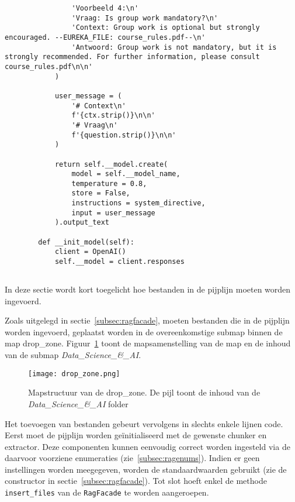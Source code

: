 \begin{verbatim}
                'Voorbeeld 4:\n'
                'Vraag: Is group work mandatory?\n'
                'Context: Group work is optional but strongly encouraged. --EUREKA_FILE: course_rules.pdf--\n'
                'Antwoord: Group work is not mandatory, but it is strongly recommended. For further information, please consult course_rules.pdf\n\n'
            )
            
            user_message = (
                '# Context\n'
                f'{ctx.strip()}\n\n'
                '# Vraag\n'
                f'{question.strip()}\n\n'
            )
            
            return self.__model.create(
                model = self.__model_name,
                temperature = 0.8,
                store = False,
                instructions = system_directive,
                input = user_message
            ).output_text
    
        def __init_model(self):
            client = OpenAI()
            self.__model = client.responses
\end{verbatim}

\subsection{}%
\label{subsec:usage}

\subsubsection{}%
\label{subsubsec:insertion}

In deze sectie wordt kort toegelicht hoe bestanden in de pijplijn moeten worden ingevoerd.

Zoals uitgelegd in sectie~\ref{subsec:ragfacade}, moeten bestanden die in de pijplijn worden ingevoerd, geplaatst worden in de overeenkomstige submap binnen de map drop\_zone. Figuur~\ref{fig:drop-zone} toont de mapsamenstelling van de map en de inhoud van de submap \emph{Data\_Science\_\&\_AI}.

\begin{figure}
    \centering
    \texttt{[image: drop\_zone.png]}
    \caption[Mapsamenstelling drop\_zone]{\label{fig:drop-zone}Mapstructuur van de drop\_zone. De pijl toont de inhoud van de \emph{Data\_Science\_\&\_AI} folder}
\end{figure}

Het toevoegen van bestanden gebeurt vervolgens in slechts enkele lijnen code. Eerst moet de pijplijn worden geïnitialiseerd met de gewenste chunker en extractor. Deze componenten kunnen eenvoudig correct worden ingesteld via de daarvoor voorziene enumeraties (zie~\ref{subsec:ragenums}). Indien er geen instellingen worden meegegeven, worden de standaardwaarden gebruikt (zie de constructor in sectie~\ref{subsec:ragfacade}). Tot slot hoeft enkel de methode \texttt{insert\_files} van de \texttt{RagFacade} te worden aangeroepen.


